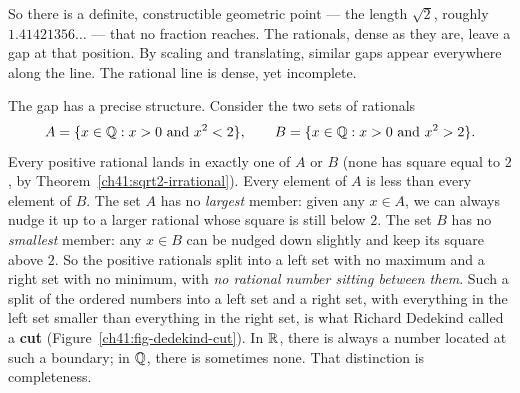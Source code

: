 So there is a definite, constructible geometric point --- the length $\sqrt 2$, roughly
$1.41421356\ldots$ --- that no fraction reaches. The rationals, dense as they are, leave a
gap at that position. By scaling and translating, similar gaps appear everywhere along the line.
The rational line is dense, yet incomplete.

\begin{happeningbox}
The gap has a precise structure. Consider the two sets of rationals
\[
  A = \{x \in \mathbb{Q} : x > 0 \text{ and } x^2 < 2\}, \qquad
  B = \{x \in \mathbb{Q} : x > 0 \text{ and } x^2 > 2\}.
\]
Every positive rational lands in exactly one of $A$ or $B$ (none has square equal to $2$,
by Theorem~\ref{ch41:sqrt2-irrational}). Every element of $A$ is less than every element
of $B$. The set $A$ has no \emph{largest} member: given any $x\in A$, we can always nudge
it up to a larger rational whose square is still below $2$. The set $B$ has no \emph{smallest} member: any
$x\in B$ can be nudged down slightly and keep its square above $2$. So the positive rationals
split into a left set with no maximum and a right set with no minimum, with
\emph{no rational number sitting between them}. Such a split of the ordered numbers into a
left set and a right set, with everything in the left set smaller than everything in the
right set, is what Richard Dedekind called a \textbf{cut} (Figure~\ref{ch41:fig-dedekind-cut}).
In $\mathbb{R}$, there is always a number located at such a boundary; in $\mathbb{Q}$, there is sometimes none.
That distinction is completeness.
\end{happeningbox}

